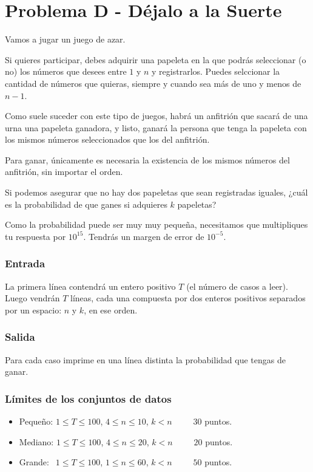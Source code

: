 \chapter*{Problema D - Déjalo a la Suerte}
Vamos a jugar un juego de azar.

Si quieres participar, debes adquirir una papeleta en
la que podrás seleccionar (o no) los números que 
desees entre $1$ y $n$ y registrarlos. Puedes selccionar
la cantidad de números que quieras, siempre y cuando
sea más de uno y menos de $n-1$.

Como suele suceder con este tipo de juegos, habrá un
anfitrión que sacará de una urna una papeleta ganadora,
y listo, ganará la persona que tenga la papeleta con 
los mismos números seleccionados que los del anfitrión.

Para ganar, únicamente es necesaria la existencia de 
los mismos números del anfitrión, sin importar el 
orden.

Si podemos asegurar que no hay dos papeletas que sean
registradas iguales, ¿cuál es la probabilidad
de que ganes si adquieres $k$ papeletas?

Como la probabilidad puede ser muy muy pequeña, 
necesitamos que multipliques tu respuesta por $10^{15}$.
Tendrás un margen de error de $10^{-5}$.




\subsection*{Entrada}
La primera línea contendrá un entero positivo $T$ (el 
número de casos a leer). Luego vendrán $T$ líneas, cada
una compuesta por dos enteros positivos separados por 
un espacio: $n$ y $k$, en ese orden.




\subsection*{Salida}
Para cada caso imprime en una línea distinta la 
probabilidad que tengas de ganar.                   




\subsection*{Límites de los conjuntos de datos}

\begin{itemize}
    \item Pequeño: $ 1 \leq T \leq 100 $, $4 \leq n 
    \leq 10$, $k < n$ $\quad \;\;\;$ $30$ puntos.
    \item Mediano: $ 1 \leq T \leq 100 $, $4 \leq n
    \leq 20$, $k < n$   $\quad \;\;\;$ $20$ puntos.
    \item Grande: $ \;\, 1 \leq T \leq 100$, $ 1 
    \leq n \leq 60 $, $k < n$ $\quad \;\;\;$ $50$ puntos.
\end{itemize}



